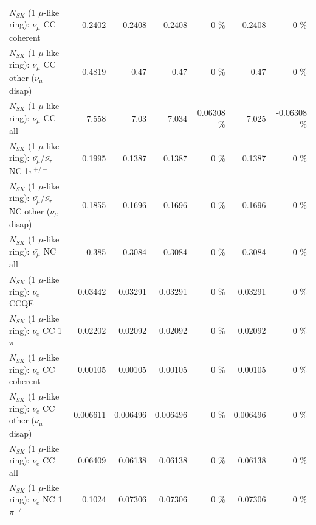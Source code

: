 \begin{table}
\begin{tabular}{| l | r | r | r  r | r  r |}
                       $N_{SK}$ (1 $\mu$-like ring): $\bar{\nu_\mu}$ CC coherent &          0.2402 &          0.2408 &          0.2408 &        0 \%  &          0.2408 &        0 \%  \\ 
        $N_{SK}$ (1 $\mu$-like ring): $\bar{\nu_\mu}$ CC other ($\nu_\mu$ disap) &          0.4819 &            0.47 &            0.47 &        0 \%  &            0.47 &        0 \%  \\ 
                          $N_{SK}$ (1 $\mu$-like ring): $\bar{\nu_{\mu}}$ CC all &           7.558 &            7.03 &           7.034 &  0.06308 \%  &           7.025 & -0.06308 \%  \\ 
\hline
  $N_{SK}$ (1 $\mu$-like ring): $\bar{\nu_\mu}$/$\bar{\nu_\tau}$ NC 1$\pi^{+/-}$ &          0.1995 &          0.1387 &          0.1387 &        0 \%  &          0.1387 &        0 \%  \\ 
$N_{SK}$ (1 $\mu$-like ring): $\bar{\nu_\mu}$/$\bar{\nu_\tau}$ NC other ($\nu_\mu$ disap) &          0.1855 &          0.1696 &          0.1696 &        0 \%  &          0.1696 &        0 \%  \\ 
                          $N_{SK}$ (1 $\mu$-like ring): $\bar{\nu_{\mu}}$ NC all &           0.385 &          0.3084 &          0.3084 &        0 \%  &          0.3084 &        0 \%  \\ 
\hline
\hline
\hline
                                      $N_{SK}$ (1 $\mu$-like ring): $\nu_e$ CCQE &         0.03442 &         0.03291 &         0.03291 &        0 \%  &         0.03291 &        0 \%  \\ 
                                 $N_{SK}$ (1 $\mu$-like ring): $\nu_e$ CC 1$\pi$ &         0.02202 &         0.02092 &         0.02092 &        0 \%  &         0.02092 &        0 \%  \\ 
                               $N_{SK}$ (1 $\mu$-like ring): $\nu_e$ CC coherent &         0.00105 &         0.00105 &         0.00105 &        0 \%  &         0.00105 &        0 \%  \\ 
                $N_{SK}$ (1 $\mu$-like ring): $\nu_e$ CC other ($\nu_\mu$ disap) &        0.006611 &        0.006496 &        0.006496 &        0 \%  &        0.006496 &        0 \%  \\ 
                                  $N_{SK}$ (1 $\mu$-like ring): $\nu_{e}$ CC all &         0.06409 &         0.06138 &         0.06138 &        0 \%  &         0.06138 &        0 \%  \\ 
\hline
                           $N_{SK}$ (1 $\mu$-like ring): $\nu_e$ NC 1$\pi^{+/-}$ &          0.1024 &         0.07306 &         0.07306 &        0 \%  &         0.07306 &        0 \%  \\ 

\end{tabular}
\end{table}

